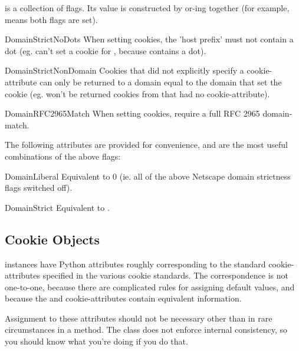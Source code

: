  is a collection of flags.  Its value is
constructed by or-ing together (for example,
 means both flags are
set).

\begin{memberdesc}{DomainStrictNoDots}
When setting cookies, the 'host prefix' must not contain a dot
(eg.  can't set a cookie for ,
because  contains a dot).
\end{memberdesc}
\begin{memberdesc}{DomainStrictNonDomain}
Cookies that did not explicitly specify a 
cookie-attribute can only be returned to a domain equal to the domain
that set the cookie (eg.  won't be returned
cookies from  that had no 
cookie-attribute).
\end{memberdesc}
\begin{memberdesc}{DomainRFC2965Match}
When setting cookies, require a full RFC 2965 domain-match.
\end{memberdesc}

The following attributes are provided for convenience, and are the
most useful combinations of the above flags:

\begin{memberdesc}{DomainLiberal}
Equivalent to 0 (ie. all of the above Netscape domain strictness flags
switched off).
\end{memberdesc}
\begin{memberdesc}{DomainStrict}
Equivalent to .
\end{memberdesc}


\subsection{Cookie Objects \label{cookie-jar-objects}}

 instances have Python attributes roughly corresponding
to the standard cookie-attributes specified in the various cookie
standards.  The correspondence is not one-to-one, because there are
complicated rules for assigning default values, and because the
 and  cookie-attributes contain equivalent
information.

Assignment to these attributes should not be necessary other than in
rare circumstances in a  method.  The class does
not enforce internal consistency, so you should know what you're
doing if you do that.

